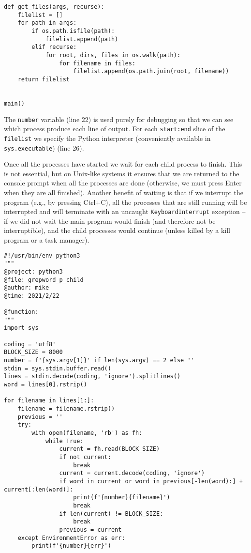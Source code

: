 \begin{lstlisting}
def get_files(args, recurse):
    filelist = []
    for path in args:
        if os.path.isfile(path):
            filelist.append(path)
        elif recurse:
            for root, dirs, files in os.walk(path):
                for filename in files:
                    filelist.append(os.path.join(root, filename))
    return filelist


main()  
\end{lstlisting}


The \verb|number| variable (line 22) is used purely for debugging so that we can see which process produce each line of output.
For each \verb|start:end| slice of the \verb|filelist| we specify the Python interpreter (conveniently available in \verb|sys.executable|) (line 26).

Once all the processes have started we wait for each child process to finish.
This is not essential, but on Unix-like systems it ensures that we are returned to the console prompt when all the processes are done (otherwise, we must press Enter when they are all finished).
Another benefit of waiting is that if we interrupt the program (e.g., by pressing Ctrl+C), all the processes that are still running will be interrupted and will terminate with an uncaught \verb|KeyboardInterrupt| exception --
if we did not wait the main program would finish (and therefore not be interruptible), and the child processes would continue (unless killed by a kill program or a task manager).




\begin{lstlisting}
#!/usr/bin/env python3
"""
@project: python3
@file: grepword_p_child
@author: mike
@time: 2021/2/22
 
@function:
"""
import sys

coding = 'utf8'
BLOCK_SIZE = 8000
number = f'{sys.argv[1]}' if len(sys.argv) == 2 else ''
stdin = sys.stdin.buffer.read()
lines = stdin.decode(coding, 'ignore').splitlines()
word = lines[0].rstrip()

for filename in lines[1:]:
    filename = filename.rstrip()
    previous = ''
    try:
        with open(filename, 'rb') as fh:
            while True:
                current = fh.read(BLOCK_SIZE)
                if not current:
                    break
                current = current.decode(coding, 'ignore')
                if word in current or word in previous[-len(word):] + current[:len(word)]:
                    print(f'{number}{filename}')
                    break
                if len(current) != BLOCK_SIZE:
                    break
                previous = current
    except EnvironmentError as err:
        print(f'{number}{err}')
  
\end{lstlisting}

